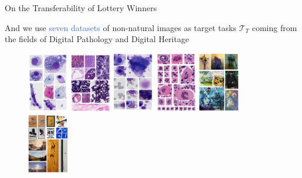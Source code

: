 \documentclass{beamer}
\begin{document}
\begin{frame}{On the Transferability of Lottery Winners}

	And we use \textcolor{RoyalBlue}{seven datasets} of non-natural images as target tasks $\mathcal{T}_T$ coming from the fields of Digital Pathology and Digital Heritage

	\begin{figure}
 		\centering
  		\includegraphics[width=1.8cm,height=\textheight,keepaspectratio]{figures/lba.pdf}%
  		\includegraphics[width=1.8cm,height=\textheight,keepaspectratio]{figures/tissus.pdf}%
  		\includegraphics[width=1.8cm,height=\textheight,keepaspectratio]{figures/mouse_lba.pdf}%
  		\includegraphics[width=1.8cm,height=\textheight,keepaspectratio]{figures/bonemarrow.pdf}%
    		\includegraphics[width=1.8cm,height=\textheight,keepaspectratio]{figures/artist.pdf}%
  		\includegraphics[width=1.8cm,height=\textheight,keepaspectratio]{figures/type.pdf}%
	\end{figure}

\end{frame}
\end{document}
